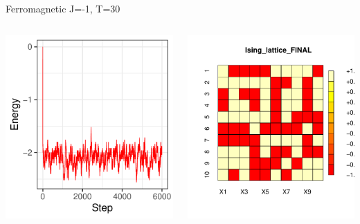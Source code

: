 \documentclass{beamer}
\begin{document}
\begin{frame}{Ferromagnetic J=-1, T=30}
\begin{columns}
\begin{column}{0.5\textwidth}
    \begin{center}
     \includegraphics[width=\textwidth]{Pic/J-1_10_6000_T=30_ENERGY.pdf}
     \end{center}
\end{column}
\begin{column}{0.5\textwidth}
    \begin{center}
     \includegraphics[width=\textwidth]{Pic/J-1_10_6000_T=30_FINAL.pdf}

\end{center}
\end{column}
\end{columns}
\end{frame}
\end{document}
